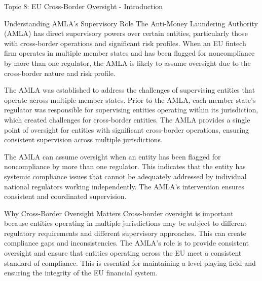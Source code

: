 \documentclass[8pt]{beamer}  %
\begin{document}
	\begin{frame}{Topic 8: EU Cross-Border Oversight - Introduction}
		\begin{block}{\large Understanding AMLA's Supervisory Role}
			The Anti-Money Laundering Authority (AMLA) has direct supervisory powers over certain entities, particularly those with cross-border operations and significant risk profiles. When an EU fintech firm operates in multiple member states and has been flagged for noncompliance by more than one regulator, the AMLA is likely to assume oversight due to the cross-border nature and risk profile.
			
			The AMLA was established to address the challenges of supervising entities that operate across multiple member states. Prior to the AMLA, each member state's regulator was responsible for supervising entities operating within its jurisdiction, which created challenges for cross-border entities. The AMLA provides a single point of oversight for entities with significant cross-border operations, ensuring consistent supervision across multiple jurisdictions.
			
			The AMLA can assume oversight when an entity has been flagged for noncompliance by more than one regulator. This indicates that the entity has systemic compliance issues that cannot be adequately addressed by individual national regulators working independently. The AMLA's intervention ensures consistent and coordinated supervision.
		\end{block}
		
		\vspace{0.2cm}
		\begin{block}{\large Why Cross-Border Oversight Matters}
			Cross-border oversight is important because entities operating in multiple jurisdictions may be subject to different regulatory requirements and different supervisory approaches. This can create compliance gaps and inconsistencies. The AMLA's role is to provide consistent oversight and ensure that entities operating across the EU meet a consistent standard of compliance. This is essential for maintaining a level playing field and ensuring the integrity of the EU financial system.
		\end{block}
	\end{frame}
	
\end{document}
